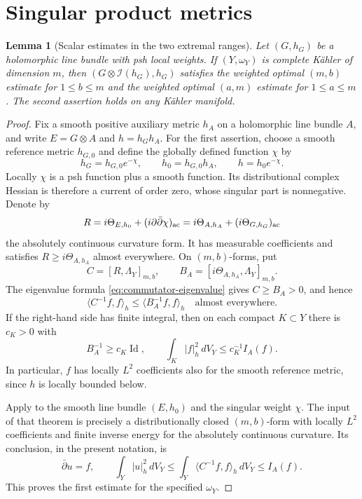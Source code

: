\documentclass[11pt,reqno]{amsart}
\numberwithin{equation}{section}
\newtheorem{lemma}[theorem]{Lemma}
\theoremstyle{definition}
\theoremstyle{remark}
\newcommand{\Id}{\operatorname{Id}}
\begin{document}
\section{Singular product metrics}\label{sec:singular-product}

\begin{lemma}[Scalar estimates in the two extremal ranges]
\label{lem:singular-scalar}
Let $(G,h_G)$ be a holomorphic line bundle with psh local weights.
If $(Y,\omega_Y)$ is complete K\"ahler of dimension $m$, then
$(G\otimes\mathcal I(h_G),h_G)$ satisfies the weighted optimal
$(m,b)$ estimate for $1\le b\le m$ and the weighted optimal
$(a,m)$ estimate for $1\le a\le m$.  The second assertion holds
on any K\"ahler manifold.
\end{lemma}
\begin{proof}
Fix a smooth positive auxiliary metric $h_A$ on a holomorphic line
bundle $A$, and write $E=G\otimes A$ and $h=h_Gh_A$.
For the first assertion, choose a smooth reference metric $h_{G,0}$
and define the globally defined function $\chi$ by
\[
 h_G=h_{G,0}e^{-\chi},\qquad h_0=h_{G,0}h_A,\qquad h=h_0e^{-\chi}.
\]
Locally $\chi$ is a psh function plus a smooth function.  Its
distributional complex Hessian is therefore a current of order zero,
whose singular part is nonnegative.  Denote by
\[
 R=i\Theta_{E,h_0}+(i\partial\bar\partial\chi)_{\rm ac}
   =i\Theta_{A,h_A}+(i\Theta_{G,h_G})_{\rm ac}
\]
the absolutely continuous curvature form.  It has measurable
coefficients and satisfies $R\ge i\Theta_{A,h_A}$ almost everywhere.
On $(m,b)$-forms, put
\[
 C=[R,\Lambda_Y]_{m,b},\qquad
 B_A=[i\Theta_{A,h_A},\Lambda_Y]_{m,b}.
\]
The eigenvalue formula \eqref{eq:commutator-eigenvalue} gives
$C\ge B_A>0$, and hence
\[
 \langle C^{-1}f,f\rangle_h
 \le\langle B_A^{-1}f,f\rangle_h
 \quad\text{almost everywhere}.
\]
If the right-hand side has finite integral, then on each compact
$K\subset Y$ there is $c_K>0$ with
\[
 B_A^{-1}\ge c_K\Id,\qquad
 \int_K|f|_h^2\,dV_Y\le c_K^{-1}I_A(f).
\]
In particular, $f$ has locally $L^2$ coefficients also for the smooth
reference metric, since $h$ is locally bounded below.

Apply \cite[Section~5, Theorem~5.1]{Dem82} to the smooth line bundle
$(E,h_0)$ and the singular weight $\chi$.  The input of that theorem
is precisely a distributionally closed $(m,b)$-form with locally
$L^2$ coefficients and finite inverse energy for the absolutely
continuous curvature.  Its conclusion, in the present notation, is
\[
 \bar\partial u=f,\qquad
 \int_Y|u|_h^2\,dV_Y
 \le\int_Y\langle C^{-1}f,f\rangle_h\,dV_Y
 \le I_A(f).
\]
This proves the first estimate for the specified $\omega_Y$.


\end{proof}
\end{document}
